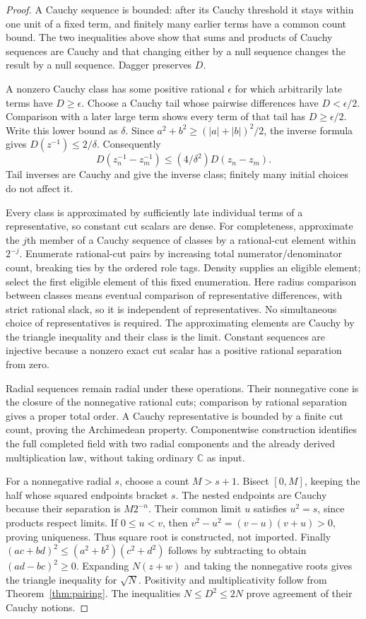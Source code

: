 \documentclass[11pt]{article}
\begin{document}
\begin{proof}
A Cauchy sequence is bounded: after its Cauchy threshold it stays within one
unit of a fixed term, and finitely many earlier terms have a common count
bound. The two inequalities above show that sums and products of Cauchy
sequences are Cauchy and that changing either by a null sequence changes
the result by a null sequence. Dagger preserves $D$.

A nonzero Cauchy class has some positive rational $\epsilon$ for which
arbitrarily late terms have $D\ge\epsilon$. Choose a Cauchy tail whose
pairwise differences have $D<\epsilon/2$. Comparison with a later large
term shows every term of that tail has $D\ge\epsilon/2$. Write this lower
bound as $\delta$. Since $a^2+b^2\ge(|a|+|b|)^2/2$, the inverse formula
gives $D(z^{-1})\le2/\delta$. Consequently
\[
D(z_n^{-1}-z_m^{-1})\le(4/\delta^2)D(z_n-z_m).
\]
Tail inverses are Cauchy and give the inverse class; finitely many initial
choices do not affect it.

Every class is approximated by sufficiently late individual terms of a
representative, so constant cut scalars are dense. For completeness,
approximate the $j$th member of a Cauchy sequence of
classes by a rational-cut element within $2^{-j}$. Enumerate rational-cut
pairs by increasing total numerator/denominator count, breaking ties by
the ordered role tags. Density supplies an eligible element; select the
first eligible element of this fixed enumeration. Here radius comparison
between classes means eventual comparison of representative differences,
with strict rational slack, so it is independent of representatives. No
simultaneous choice of representatives is required. The approximating
elements are Cauchy by the triangle inequality and their class is the limit.
Constant sequences are injective because a
nonzero exact cut scalar has a positive rational separation from zero.

Radial sequences remain radial under these operations. Their nonnegative
cone is the closure of the nonnegative rational cuts; comparison by rational
separation gives a proper total order. A Cauchy representative is bounded
by a finite cut count, proving the Archimedean property. Componentwise
construction identifies the full completed field with two radial components
and the already derived multiplication law, without taking ordinary
$\mathbb C$ as input.

For a nonnegative radial $s$, choose a count $M>s+1$. Bisect $[0,M]$,
keeping the half whose squared endpoints bracket $s$. The nested endpoints
are Cauchy because their separation is $M2^{-n}$. Their common limit $u$
satisfies $u^2=s$, since products respect limits. If $0\le u<v$, then
$v^2-u^2=(v-u)(v+u)>0$, proving uniqueness. Thus square root is constructed,
not imported. Finally
$(ac+bd)^2\le(a^2+b^2)(c^2+d^2)$ follows by subtracting to obtain
$(ad-bc)^2\ge0$. Expanding $N(z+w)$ and taking the nonnegative roots gives
the triangle inequality for $\sqrt N$. Positivity and multiplicativity
follow from Theorem~\ref{thm:pairing}. The inequalities
$N\le D^2\le2N$ prove agreement of their Cauchy notions.
\end{proof}
\end{document}
